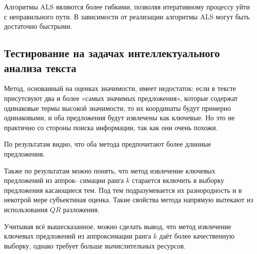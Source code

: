 Алгоритмы ALS являются более гибкими, позволяя итеративному процессу уйти с неправильного пути.
В зависимости от реализации алгоритмы ALS могут быть достаточно быстрыми.



\newpage



\subsection{Тестирование на задачах интеллектуального анализа текста}

Метод, основанный на оценках значимости, имеет недостаток:
если в тексте присутсвуют два и более «самых значимых предложения», которые содержат одинаковые термы высокой значимости,
то их координаты будут примерно одинаковыми, и оба предложения будут извлечены как ключевые.
Но это не практично со стороны поиска информации, так как они очень похожи.

По результатам видно, что оба метода предпочитают более длинные предложения.

Также по результатам можно понять, что метод извлечение ключевых предложений из аппрок-
симации ранга $k$ старается включить в выборку предложения касающиеся  тем.
Под  тем подразумевается их разнородность и в некотрой мере субъектиная оценка.
Такие свойства метода напрямую вытекают из использования $QR$ разложения.

Учитывая всё вышесказанное, можно сделать вывод, что метод извлечение ключевых предложений из
аппроксимации ранга $k$ даёт более качественную выборку, однако требует больше вычислительных ресурсов.
